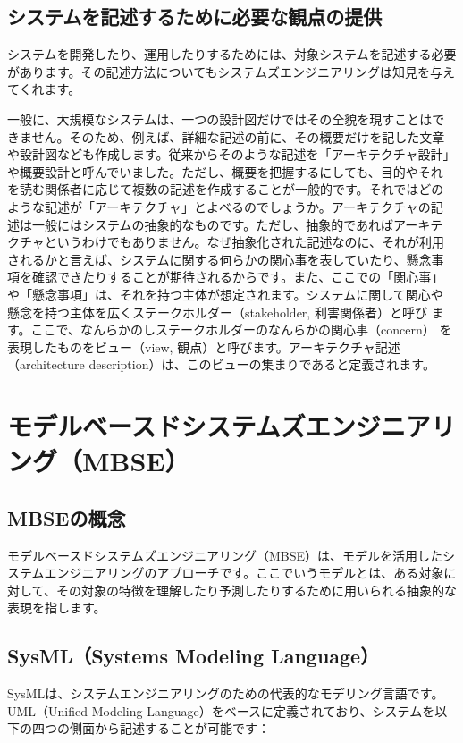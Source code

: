 \subsection{システムを記述するために必要な観点の提供}

システムを開発したり、運用したりするためには、対象システムを記述する必要があります。その記述方法についてもシステムズエンジニアリングは知見を与えてくれます。

一般に、大規模なシステムは、一つの設計図だけではその全貌を現すことはで
きません。そのため、例えば、詳細な記述の前に、その概要だけを記した文章
や設計図なども作成します。従来からそのような記述を「アーキテクチャ設計」
や概要設計と呼んでいました。ただし、概要を把握するにしても、目的やそれ
を読む関係者に応じて複数の記述を作成することが一般的です。それではどの
ような記述が「アーキテクチャ」とよべるのでしょうか。アーキテクチャの記
述は一般にはシステムの抽象的なものです。ただし、抽象的であればアーキテ
クチャというわけでもありません。なぜ抽象化された記述なのに、それが利用
されるかと言えば、システムに関する何らかの関心事を表していたり、懸念事
項を確認できたりすることが期待されるからです。また、ここでの「関心事」
や「懸念事項」は、それを持つ主体が想定されます。システムに関して関心や
懸念を持つ主体を広くステークホルダー（stakeholder, 利害関係者）と呼び
ます。ここで、なんらかのしステークホルダーのなんらかの関心事（concern）
を表現したものをビュー（view, 観点）と呼びます。アーキテクチャ記述
（architecture description）は、このビューの集まりであると定義されます。

\section{モデルベースドシステムズエンジニアリング（MBSE）}

\subsection{MBSEの概念}

モデルベースドシステムズエンジニアリング（MBSE）は、モデルを活用したシステムエンジニアリングのアプローチです。ここでいうモデルとは、ある対象に対して、その対象の特徴を理解したり予測したりするために用いられる抽象的な表現を指します。

\subsection{SysML（Systems Modeling Language）}

SysMLは、システムエンジニアリングのための代表的なモデリング言語です。UML（Unified Modeling Language）をベースに定義されており、システムを以下の四つの側面から記述することが可能です：

